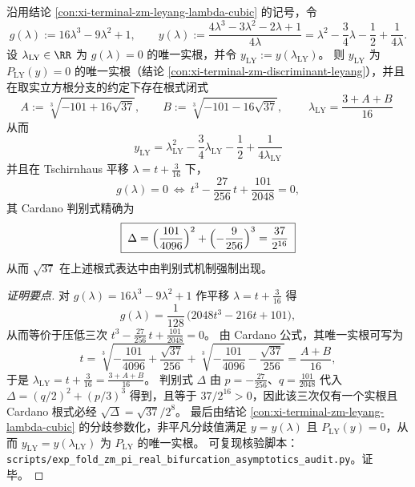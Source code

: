 \begin{conclusion}\label{con:xi-terminal-zm-leyang-real-branchpoint-cardano}
沿用结论 \ref{con:xi-terminal-zm-leyang-lambda-cubic} 的记号，令
\[
g(\lambda):=16\lambda^3-9\lambda^2+1,
\qquad
y(\lambda):=\frac{4\lambda^3-3\lambda^2-2\lambda+1}{4\lambda}
=\lambda^2-\frac34\lambda-\frac12+\frac{1}{4\lambda}.
\]
设 \(\lambda_{\mathrm{LY}}\in\RR\) 为 \(g(\lambda)=0\) 的唯一实根，并令 \(y_{\mathrm{LY}}:=y(\lambda_{\mathrm{LY}})\)。
则 \(y_{\mathrm{LY}}\) 为 \(P_{\mathrm{LY}}(y)=0\) 的唯一实根（结论 \ref{con:xi-terminal-zm-discriminant-leyang}），并且在取实立方根分支的约定下存在根式闭式
\[
A:=\sqrt[3]{-101+16\sqrt{37}},\qquad B:=\sqrt[3]{-101-16\sqrt{37}},
\qquad
\boxed{\;\lambda_{\mathrm{LY}}=\frac{3+A+B}{16}\;}
\]
从而
\[
\boxed{\;y_{\mathrm{LY}}=\lambda_{\mathrm{LY}}^2-\frac34\lambda_{\mathrm{LY}}-\frac12+\frac{1}{4\lambda_{\mathrm{LY}}}\;}
\]
并且在 Tschirnhaus 平移 \(\lambda=t+\tfrac{3}{16}\) 下，
\[
g(\lambda)=0\ \Longleftrightarrow\ t^3-\frac{27}{256}\,t+\frac{101}{2048}=0,
\]
其 Cardano 判别式精确为
\[
\boxed{\;\Delta=\Bigl(\frac{101}{4096}\Bigr)^2+\Bigl(-\frac{9}{256}\Bigr)^3=\frac{37}{2^{16}}\;}
\]
从而 \(\sqrt{37}\) 在上述根式表达中由判别式机制强制出现。
\end{conclusion}
\begin{proof}[证明要点]
对 \(g(\lambda)=16\lambda^3-9\lambda^2+1\) 作平移 \(\lambda=t+\tfrac{3}{16}\) 得
\[
g(\lambda)=\frac{1}{128}\,\bigl(2048t^3-216t+101\bigr),
\]
从而等价于压低三次
\(
t^3-\frac{27}{256}\,t+\frac{101}{2048}=0
\)。
由 Cardano 公式，其唯一实根可写为
\[
t=\sqrt[3]{-\frac{101}{4096}+\frac{\sqrt{37}}{256}}+\sqrt[3]{-\frac{101}{4096}-\frac{\sqrt{37}}{256}}
=\frac{A+B}{16},
\]
于是 \(\lambda_{\mathrm{LY}}=t+\tfrac{3}{16}=\tfrac{3+A+B}{16}\)。
判别式 \(\Delta\) 由 \(p=-\tfrac{27}{256}\)、\(q=\tfrac{101}{2048}\) 代入
\(
\Delta=(q/2)^2+(p/3)^3
\)
得到，且等于 \(37/2^{16}>0\)，因此该三次仅有一个实根且 Cardano 根式必经 \(\sqrt{\Delta}=\sqrt{37}/2^{8}\)。
最后由结论 \ref{con:xi-terminal-zm-leyang-lambda-cubic} 的分歧参数化，非平凡分歧值满足 \(y=y(\lambda)\) 且 \(P_{\mathrm{LY}}(y)=0\)，从而 \(y_{\mathrm{LY}}=y(\lambda_{\mathrm{LY}})\) 为 \(P_{\mathrm{LY}}\) 的唯一实根。
可复现核验脚本：\texttt{scripts/exp\_fold\_zm\_pi\_real\_bifurcation\_asymptotics\_audit.py}。证毕。
\end{proof}

